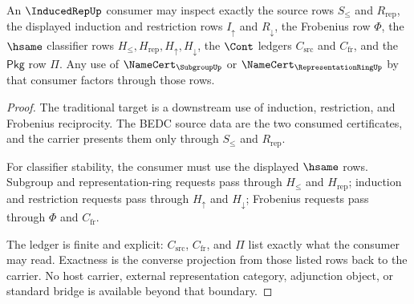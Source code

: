 \begin{theorem}
\label{thm:inducedrep-consumer-boundary}
An $\InducedRepUp$ consumer may inspect exactly the source rows
$S_{\leq}$ and $R_{\mathrm{rep}}$, the displayed induction and restriction
rows $I_{\uparrow}$ and $R_{\downarrow}$, the Frobenius row $\Phi$, the
$\hsame$ classifier rows $H_{\leq},H_{\mathrm{rep}},H_{\uparrow},
H_{\downarrow}$, the $\Cont$ ledgers $C_{\mathrm{src}}$ and
$C_{\mathrm{fr}}$, and the $\mathsf{Pkg}$ row $\Pi$. Any use of
$\NameCert_{\SubgroupUp}$ or $\NameCert_{\RepresentationRingUp}$ by that
consumer factors through those rows.
\end{theorem}
\begin{proof}
The traditional target is a downstream use of induction, restriction, and
Frobenius reciprocity. The BEDC source data are the two consumed
certificates, and the carrier presents them only through $S_{\leq}$ and
$R_{\mathrm{rep}}$.

For classifier stability, the consumer must use the displayed $\hsame$ rows.
Subgroup and representation-ring requests pass through $H_{\leq}$ and
$H_{\mathrm{rep}}$; induction and restriction requests pass through
$H_{\uparrow}$ and $H_{\downarrow}$; Frobenius requests pass through
$\Phi$ and $C_{\mathrm{fr}}$.

The ledger is finite and explicit: $C_{\mathrm{src}}$, $C_{\mathrm{fr}}$,
and $\Pi$ list exactly what the consumer may read. Exactness is the converse
projection from those listed rows back to the carrier. No host carrier,
external representation category, adjunction object, or standard bridge is
available beyond that boundary.
\end{proof}

